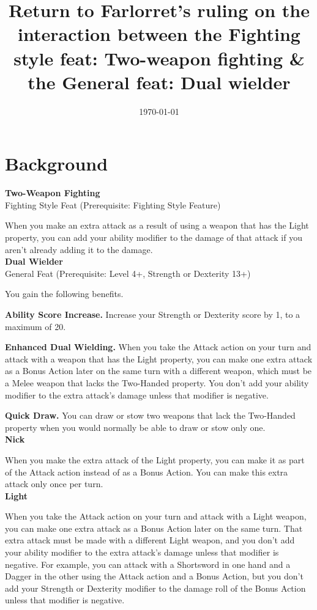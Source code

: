 \documentclass{article}
\title{Return to Farlorret's ruling on the interaction between the Fighting style feat: Two-weapon fighting \& the General feat: Dual wielder}
\date{\today}
\begin{document}
    \maketitle

    \section*{Background}

    \textbf{Two-Weapon Fighting}\\
    Fighting Style Feat (Prerequisite: Fighting Style Feature)

    When you make an extra attack as a result of using a weapon that has the Light property, you can add your ability modifier to the damage of that attack if you aren’t already adding it to the damage.\\
    \textbf{Dual Wielder}\\
    General Feat (Prerequisite: Level 4+, Strength or Dexterity 13+)

    You gain the following benefits.
    
    \textbf{Ability Score Increase.} Increase your Strength or Dexterity score by 1, to a maximum of 20.
    
    \textbf{Enhanced Dual Wielding.} When you take the Attack action on your turn and attack with a weapon that has the Light property, you can make one extra attack as a Bonus Action later on the same turn with a different weapon, which must be a Melee weapon that lacks the Two-Handed property. You don’t add your ability modifier to the extra attack’s damage unless that modifier is negative.
    
    \textbf{Quick Draw.} You can draw or stow two weapons that lack the Two-Handed property when you would normally be able to draw or stow only one.\\
    \textbf{Nick}

    When you make the extra attack of the Light property, you can make it as part of the Attack action instead of as a Bonus Action. You can make this extra attack only once per turn.\\
    \textbf{Light}

    When you take the Attack action on your turn and attack with a Light weapon, you can make one extra attack as a Bonus Action later on the same turn. That extra attack must be made with a different Light weapon, and you don’t add your ability modifier to the extra attack’s damage unless that modifier is negative. For example, you can attack with a Shortsword in one hand and a Dagger in the other using the Attack action and a Bonus Action, but you don’t add your Strength or Dexterity modifier to the damage roll of the Bonus Action unless that modifier is negative.
\end{document}
